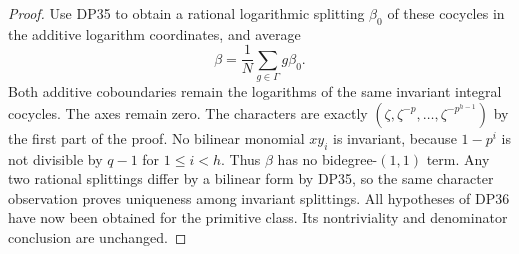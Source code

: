 \documentclass[11pt,a4paper]{article}
\theoremstyle{definition}\newtheorem{remark}[theorem]{Remark}
\begin{document}
\begin{proof}
Use DP35 to obtain a rational logarithmic splitting $\beta_0$ of these cocycles in the additive logarithm coordinates, and average
\[
 \beta=\frac1N\sum_{g\in\Gamma}g\beta_0.
\]
Both additive coboundaries remain the logarithms of the same invariant integral cocycles. The axes remain zero. The characters are exactly $(\zeta,\zeta^{-p},\ldots,\zeta^{-p^{h-1}})$ by the first part of the proof. No bilinear monomial $xy_i$ is invariant, because $1-p^i$ is not divisible by $q-1$ for $1\le i<h$. Thus $\beta$ has no bidegree-$(1,1)$ term. Any two rational splittings differ by a bilinear form by DP35, so the same character observation proves uniqueness among invariant splittings. All hypotheses of DP36 have now been obtained for the primitive class. Its nontriviality and denominator conclusion are unchanged.
\end{proof}
\end{document}
